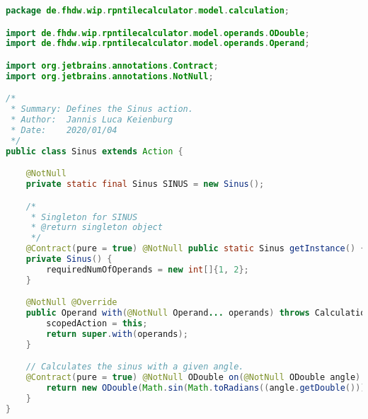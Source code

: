 \begin{lstlisting}[caption=Sinus (Keienburg),label=list:Sinus,language=Java]
package de.fhdw.wip.rpntilecalculator.model.calculation;

import de.fhdw.wip.rpntilecalculator.model.operands.ODouble;
import de.fhdw.wip.rpntilecalculator.model.operands.Operand;

import org.jetbrains.annotations.Contract;
import org.jetbrains.annotations.NotNull;

/*
 * Summary: Defines the Sinus action.
 * Author:  Jannis Luca Keienburg
 * Date:    2020/01/04
 */
public class Sinus extends Action {

    @NotNull
    private static final Sinus SINUS = new Sinus();

    /*
     * Singleton for SINUS
     * @return singleton object
     */
    @Contract(pure = true) @NotNull public static Sinus getInstance() { return SINUS; }
    private Sinus() {
        requiredNumOfOperands = new int[]{1, 2};
    }

    @NotNull @Override
    public Operand with(@NotNull Operand... operands) throws CalculationException {
        scopedAction = this;
        return super.with(operands);
    }

    // Calculates the sinus with a given angle.
    @Contract(pure = true) @NotNull ODouble on(@NotNull ODouble angle) {
        return new ODouble(Math.sin(Math.toRadians((angle.getDouble()))));
    }
}
\end{lstlisting}    

